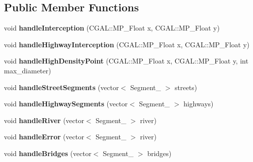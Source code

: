 \subsection*{Public Member Functions}
\begin{DoxyCompactItemize}
\item 
\hypertarget{class_post_script_int_writer_a0cfdc6026b5a0067c97e0724b6d3f274}{}\label{class_post_script_int_writer_a0cfdc6026b5a0067c97e0724b6d3f274} 
void {\bfseries handle\+Interception} (C\+G\+A\+L\+::\+M\+P\+\_\+\+Float x, C\+G\+A\+L\+::\+M\+P\+\_\+\+Float y)
\item 
\hypertarget{class_post_script_int_writer_ac25b006a0eeaf2389e80b8f5ac4abea6}{}\label{class_post_script_int_writer_ac25b006a0eeaf2389e80b8f5ac4abea6} 
void {\bfseries handle\+Highway\+Interception} (C\+G\+A\+L\+::\+M\+P\+\_\+\+Float x, C\+G\+A\+L\+::\+M\+P\+\_\+\+Float y)
\item 
\hypertarget{class_post_script_int_writer_a01160610eeab71add25021437d6d4a6a}{}\label{class_post_script_int_writer_a01160610eeab71add25021437d6d4a6a} 
void {\bfseries handle\+High\+Density\+Point} (C\+G\+A\+L\+::\+M\+P\+\_\+\+Float x, C\+G\+A\+L\+::\+M\+P\+\_\+\+Float y, int max\+\_\+diameter)
\item 
\hypertarget{class_post_script_int_writer_a8727400a956271d23d8ba582bca30273}{}\label{class_post_script_int_writer_a8727400a956271d23d8ba582bca30273} 
void {\bfseries handle\+Street\+Segments} (vector$<$ Segment\+\_ $>$ streets)
\item 
\hypertarget{class_post_script_int_writer_aea0d5736a30736b0aa6e8ebe7c903478}{}\label{class_post_script_int_writer_aea0d5736a30736b0aa6e8ebe7c903478} 
void {\bfseries handle\+Highway\+Segments} (vector$<$ Segment\+\_ $>$ highways)
\item 
\hypertarget{class_post_script_int_writer_acb5dbf5b3e10b0ab3a8ab3c1a3e0e1e6}{}\label{class_post_script_int_writer_acb5dbf5b3e10b0ab3a8ab3c1a3e0e1e6} 
void {\bfseries handle\+River} (vector$<$ Segment\+\_ $>$ river)
\item 
\hypertarget{class_post_script_int_writer_ac00aa8d3cbf17c94653ae31f4c91eff4}{}\label{class_post_script_int_writer_ac00aa8d3cbf17c94653ae31f4c91eff4} 
void {\bfseries handle\+Error} (vector$<$ Segment\+\_ $>$ river)
\item 
\hypertarget{class_post_script_int_writer_ae763ce8b90fb0d2a79eae84e2f9be3a4}{}\label{class_post_script_int_writer_ae763ce8b90fb0d2a79eae84e2f9be3a4} 
void {\bfseries handle\+Bridges} (vector$<$ Segment\+\_ $>$ bridges)
\item 

\end{DoxyCompactItemize}
